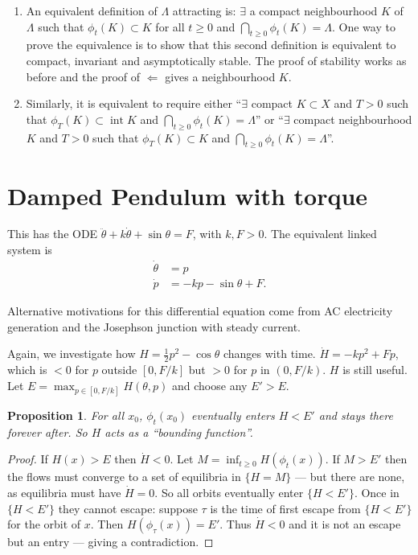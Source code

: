\documentclass{notes}
\theoremstyle{plain}
\newtheorem*{proposition}{Proposition}
\DeclareMathOperator{\inter}{int}
\begin{document}
\begin{enumerate}
\item An equivalent definition of $\Lambda$ attracting is: $\exists$
a compact neighbourhood $K$ of $\Lambda$ such that $\phi_t(K) \subset K$
for all $t \ge 0$ and $\bigcap_{t \ge 0} \phi_t(K) = \Lambda$.  One
way to prove the equivalence is to show that this second definition is
equivalent to compact, invariant and asymptotically stable.  The proof
of stability works as before and the proof of $\Leftarrow$ gives a 
neighbourhood $K$.
\item Similarly, it is equivalent to require either
``$\exists$ compact $K \subset X$ and $T > 0$ such that $\phi_T(K)
\subset \inter K$ and $\bigcap_{t \ge 0} \phi_t(K) = \Lambda$'' or
``$\exists $ compact neighbourhood $K$ and $T > 0$ such that $\phi_T(K)
\subset K$ and $\bigcap_{t \ge 0} \phi_t(K) = \Lambda$''.
\end{enumerate}

\section{Damped Pendulum with torque}

This has the ODE $\ddot{\theta} + k \dot{\theta} + \sin \theta = F$,
with $k, F > 0$.  The equivalent linked system is
\begin{align*}
\dot{\theta} &= p \\
\dot{p} &= -k p - \sin \theta + F.
\end{align*}

Alternative motivations for this differential equation come from 
AC electricity generation and the Josephson junction with steady current.

Again, we investigate how $H = \frac{1}{2} p^2 - \cos \theta$ changes with
time.  $\dot{H} = -k p^2 + F p$, which is $ < 0$ for $p$ outside $[0, F/k]$
but $> 0$ for $p$ in $(0,F/k)$.  $H$ is still useful.  Let $E
= \max_{p \in [0,F/k]} H(\theta,p)$ and choose any $E' > E$.

\begin{proposition}
For all $x_0$, $\phi_t(x_0)$ eventually enters $H < E'$ and stays there
forever after.  So $H$ acts as a ``bounding function''.
\end{proposition}

\begin{proof}
If $H(x) > E$ then $\dot{H} < 0$.  Let $M = \inf_{t \ge 0} H(\phi_t(x))$.
If $M > E'$ then the flows must converge to a set of equilibria in $\{ H = M
\}$ --- but there are none, as equilibria must have $\dot{H} = 0$.  So
all orbits eventually enter $\{ H < E' \}$.  Once in $\{ H < E' \}$ they
cannot escape: suppose $\tau$ is the time of first escape from
$\{H < E'\}$ for the orbit of $x$.  Then $H(\phi_\tau(x)) = E'$.  Thus
$\dot{H} < 0$ and it is not an escape but an entry --- giving a contradiction.
\end{proof}
\end{document}
